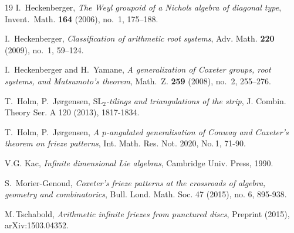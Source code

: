 \documentclass[11pt,a4paper]{amsart}
\theoremstyle{definition}
\numberwithin{equation}{section}
\begin{document}
\begin{thebibliography}{19}
I.~Heckenberger, {\em The {W}eyl groupoid of a {N}ichols algebra of
  diagonal type}, Invent.~Math. \textbf{164} (2006), no.~1, 175--188.

I.\ Heckenberger, {\em Classification of arithmetic root systems}, Adv. Math. {\bf 220} (2009), no.~1, 59--124.



I.~Heckenberger and H.~Yamane, \emph{A generalization of Coxeter groups, root systems, and Matsumoto's theorem}, Math.~Z. {\bf 259} (2008), no.~2, 255--276.

T.\ Holm, P.\ J{\o}rgensen, 
{\em $\mathrm{SL}_2$-tilings and triangulations of the strip},
J. Combin. Theory Ser. A 120 (2013), 1817-1834.

T.\ Holm, P.\ J{\o}rgensen, 
{\em A $p$-angulated generalisation of Conway and Coxeter's 
theorem on frieze patterns},
Int. Math. Res. Not. 2020, No.\,1, 71-90.

V.G. Kac, \emph{Infinite dimensional {L}ie algebras}, Cambridge Univ. Press,
  1990.


S.\ Morier-Genoud, {\em Coxeter's frieze patterns at the crossroads of algebra, 
geometry and combinatorics}, 
Bull. Lond. Math. Soc. 47 (2015), no. 6, 895-938.

M.\,Tschabold, {\em Arithmetic infinite friezes from punctured discs},
Preprint (2015), arXiv:1503.04352.


\end{thebibliography}
\end{document}
